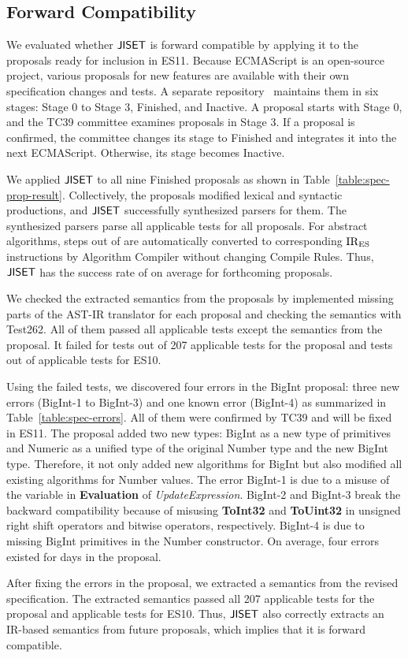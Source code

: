\subsection{Forward Compatibility}
We evaluated whether \( \text{\sf JISET} \) is forward compatible by applying it
to the proposals ready for inclusion in ES11.  Because
ECMAScript is an open-source project, various proposals for new
features are available with their own specification changes and tests.
A separate repository~\cite{proposals} maintains them in six
stages: Stage 0 to Stage 3, Finished, and Inactive.  A proposal
starts with Stage 0, and the TC39 committee examines proposals in Stage 3.
If a proposal is confirmed, the committee changes
its stage to Finished and integrates it into the next ECMAScript.
Otherwise, its stage becomes Inactive.

We applied \( \text{\sf JISET} \) to all nine Finished proposals as shown in
Table~\ref{table:spec-prop-result}.
Collectively, the proposals modified  lexical and
 syntactic productions, and \( \text{\sf JISET} \) successfully
synthesized parsers for them.  The synthesized parsers parse all
applicable tests for all proposals.  For abstract algorithms,
 steps out of  are automatically converted to
corresponding \( \text{IR}_\text{ES} \) instructions by \textsf{Algorithm Compiler}
without changing {\sf Compile Rules}.  Thus, \( \text{\sf JISET} \) has the
success rate of  on average for forthcoming proposals.

We checked the extracted semantics from the proposals
by implemented missing parts of the AST-IR translator for
each proposal and checking the semantics with Test262.  All of them
passed all applicable tests except the semantics from the
 proposal.  It failed for  tests out of 207
applicable tests for the proposal and  tests out of
 applicable tests for ES10.

Using the failed tests, we discovered four errors in the
BigInt proposal: three new errors (BigInt-1 to BigInt-3) and one known
error (BigInt-4) as summarized in Table~\ref{table:spec-errors}.
All of them were confirmed by TC39 and will be fixed in ES11.
The proposal added two new types: BigInt as a new type of primitives
and Numeric as a unified type of the original Number type and the new BigInt type.
Therefore, it not only added new algorithms for BigInt but also modified
all existing algorithms for Number values.
The error BigInt-1 is due to a misuse of the variable 
 in {\bf Evaluation} of {\it UpdateExpression}.
BigInt-2 and BigInt-3 break the backward compatibility because of
misusing {\bf ToInt32} and {\bf ToUint32}
in unsigned right shift operators and bitwise operators, respectively.
BigInt-4 is due to missing BigInt primitives in the Number constructor.
On average, four errors existed for  days in the proposal.

After fixing the errors in the proposal, we extracted a semantics from
the revised specification.  The extracted semantics passed all 207
applicable tests for the proposal and  applicable tests
for ES10.  Thus, \( \text{\sf JISET} \) also correctly extracts an IR-based
semantics from future proposals, which implies that it is forward compatible.
